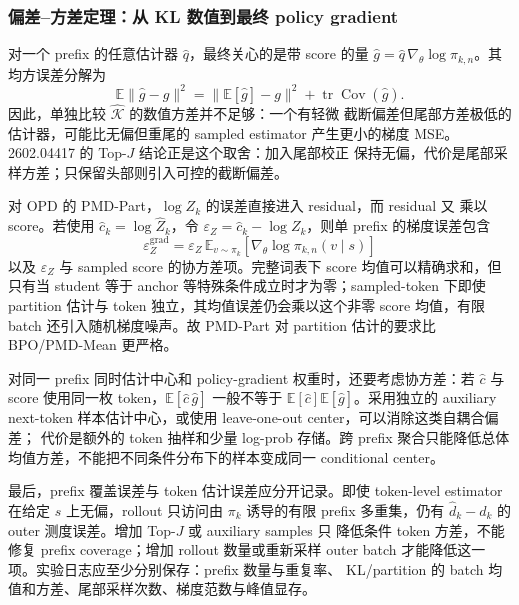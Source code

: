 \subsubsection*{偏差--方差定理：从 KL 数值到最终 policy gradient}
对一个 prefix 的任意估计器 $\widehat q$，最终关心的是带 score 的量
$\widehat g=\widehat q\,\nabla_\theta\log\pi_{k,n}$。其均方误差分解为
\begin{equation}
\mathbb E\lVert\widehat g-g\rVert^2
=\lVert\mathbb E[\widehat g]-g\rVert^2
+\operatorname{tr}\operatorname{Cov}(\widehat g).
\end{equation}
因此，单独比较 $\widehat{\mathcal K}$ 的数值方差并不足够：一个有轻微
截断偏差但尾部方差极低的估计器，可能比无偏但重尾的 sampled estimator
产生更小的梯度 MSE。2602.04417 的 Top-$J$ 结论正是这个取舍：加入尾部校正
保持无偏，代价是尾部采样方差；只保留头部则引入可控的截断偏差。

对 OPD 的 PMD-Part，$\log Z_k$ 的误差直接进入 residual，而 residual 又
乘以 score。若使用 $\widehat c_k=\log\widehat Z_k$，令
$\varepsilon_Z=\widehat c_k-\log Z_k$，则单 prefix 的梯度误差包含
\begin{equation}
\varepsilon_Z^{\mathrm{grad}}
=\varepsilon_Z\,\mathbb E_{v\sim\pi_k}
\left[\nabla_\theta\log\pi_{k,n}(v\mid s)\right]
\end{equation}
以及 $\varepsilon_Z$ 与 sampled score 的协方差项。完整词表下 score 均值可以精确求和，但只有当 student 等于 anchor 等特殊条件成立时才为零；sampled-token 下即使 partition 估计与 token 独立，其均值误差仍会乘以这个非零 score 均值，有限 batch 还引入随机梯度噪声。故 PMD-Part 对 partition
估计的要求比 BPO/PMD-Mean 更严格。

对同一 prefix 同时估计中心和 policy-gradient 权重时，还要考虑协方差：若
$\widehat c$ 与 score 使用同一枚 token，$\mathbb E[\widehat c\,\widehat g]$
一般不等于 $\mathbb E[\widehat c]\mathbb E[\widehat g]$。采用独立的 auxiliary
next-token 样本估计中心，或使用 leave-one-out center，可以消除这类自耦合偏差；
代价是额外的 token 抽样和少量 log-prob 存储。跨 prefix 聚合只能降低总体
均值方差，不能把不同条件分布下的样本变成同一 conditional center。

最后，prefix 覆盖误差与 token 估计误差应分开记录。即使 token-level estimator
在给定 $s$ 上无偏，rollout 只访问由 $\pi_k$ 诱导的有限 prefix 多重集，仍有
$\widehat d_k-d_k$ 的 outer 测度误差。增加 Top-$J$ 或 auxiliary samples 只
降低条件 token 方差，不能修复 prefix coverage；增加 rollout 数量或重新采样
outer batch 才能降低这一项。实验日志应至少分别保存：prefix 数量与重复率、
KL/partition 的 batch 均值和方差、尾部采样次数、梯度范数与峰值显存。

